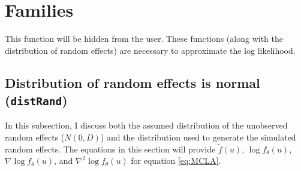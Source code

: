 \documentclass{article}
\begin{document}


\section{Families} \label{sec:fam}
This function will be hidden from the user.  These functions (along with the distribution of random effects) are necessary to approximate the log likelihood.


\subsection{Distribution of random effects is normal (\texttt{distRand})}\label{sec:distRand}
In this subsection, I discuss both the assumed distribution of the unobserved random effects ($N(0,D)$) and the distribution used to generate the simulated random effects.  The equations in this section will provide $\tilde{f}(u)$, $\log f_\theta(u)$, $\nabla \log f_\theta(u)$, and $\nabla^2 \log f_\theta(u)$ for equation \ref{eq:MCLA}. 




\end{document}
